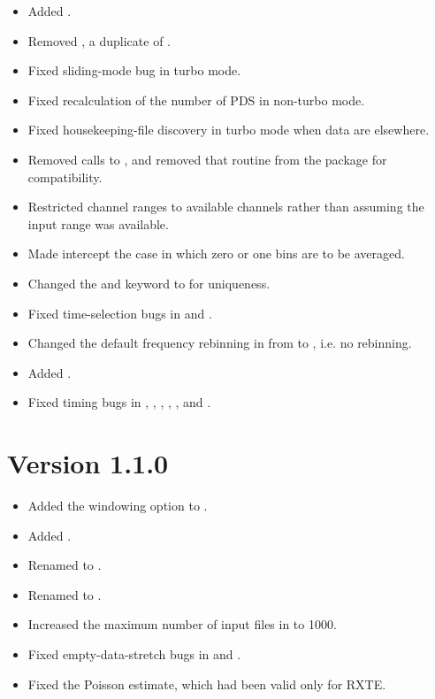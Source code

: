 \begin{itemize}
\item Added .
\item Removed , a duplicate of .
\item Fixed  sliding-mode bug in turbo mode.
\item Fixed  recalculation of the number of PDS in non-turbo mode.
\item Fixed  housekeeping-file discovery in turbo mode when data are elsewhere.
\item Removed calls to , and removed that routine
      from the package for compatibility.
\item Restricted  channel ranges to available channels rather
      than assuming the input range was available.
\item Made  intercept the case in which zero or one
      bins are to be averaged.
\item Changed the  and 
       keyword to  for uniqueness.
\item Fixed time-selection bugs in  and
      .
\item Changed the default frequency rebinning in  from
       to , i.e. no rebinning.
\item Added .
\item Fixed timing bugs in , ,
      , , , and
      .
\end{itemize}

\section*{Version 1.1.0}

\begin{itemize}
\item Added the windowing option to .
\item Added .
\item Renamed  to .
\item Renamed  to .
\item Increased the maximum number of input files in  to 1000.
\item Fixed empty-data-stretch bugs in  and .
\item Fixed the  Poisson estimate, which had been valid only
      for RXTE.
\end{itemize}

